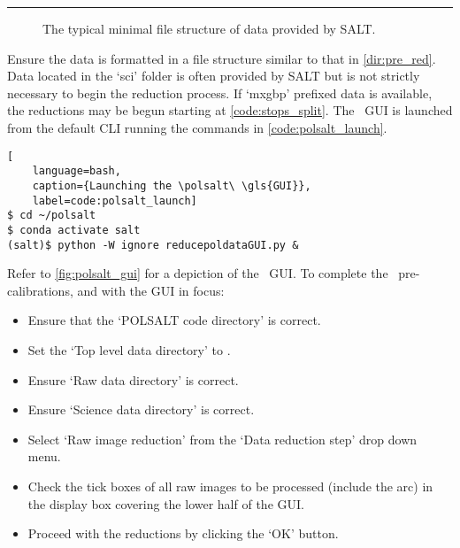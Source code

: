 \vspace{0.5\baselineskip}\hrule

\begin{figure}[h!]
    \centering
    \begin{minipage}{8cm}
    \end{minipage}
    \caption{The typical minimal file structure of data provided by \gls{SALT}.}
    \label{dir:pre_red}
\end{figure}

Ensure the data is formatted in a file structure similar to that in \autoref{dir:pre_red}. Data located in the `sci' folder is often provided by \gls{SALT} but is not strictly necessary to begin the reduction process. If `mxgbp' prefixed data is available, the reductions may be begun starting at \autoref{code:stops_split}. The \polsalt\ \gls{GUI} is launched from the default \gls{CLI} running the commands in \autoref{code:polsalt_launch}.

\begin{lstlisting}[
    language=bash,
    caption={Launching the \polsalt\ \gls{GUI}},
    label=code:polsalt_launch]
$ cd ~/polsalt
$ conda activate salt
(salt)$ python -W ignore reducepoldataGUI.py &
\end{lstlisting}

Refer to \autoref{fig:polsalt_gui} for a depiction of the \polsalt\ \gls{GUI}. To complete the \polsalt\ pre-calibrations, and with the \gls{GUI} in focus:
\begin{itemize}
    \item Ensure that the `POLSALT code directory' is correct.
    \item Set the `Top level data directory' to \obsdate.
    \item Ensure `Raw data directory' is correct.
    \item Ensure `Science data directory' is correct.
    \item Select `Raw image reduction' from the `Data reduction step' drop down menu.
    \item Check the tick boxes of all raw images to be processed (include the arc) in the display box covering the lower half of the \gls{GUI}.
    \item Proceed with the reductions by clicking the `OK' button.
\end{itemize}

